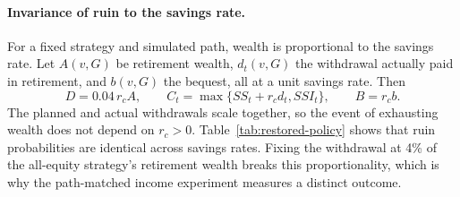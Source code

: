 \paragraph{Invariance of ruin to the savings rate.}
For a fixed strategy and simulated path, wealth is proportional to the savings rate. Let $A(v,G)$ be
retirement wealth, $d_t(v,G)$ the withdrawal actually paid in retirement, and $b(v,G)$ the bequest, all at
a unit savings rate. Then
\begin{equation}
 D=0.04\,r_cA,\qquad C_t=\max\{SS_t+r_c d_t,SSI_t\},\qquad B=r_cb.
 \label{eq:scale-wealth}
\end{equation}
The planned and actual withdrawals scale together, so the event of exhausting wealth does not depend on
$r_c>0$. Table~\ref{tab:restored-policy} shows that ruin probabilities are identical across savings rates.
Fixing the withdrawal at 4\% of the all-equity strategy's retirement wealth breaks this proportionality,
which is why the path-matched income experiment measures a distinct outcome.

